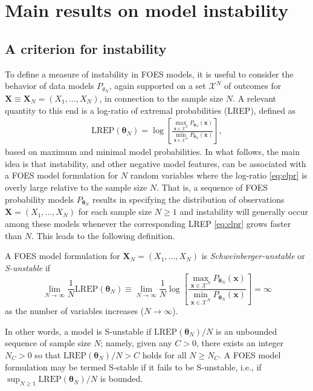 \documentclass[]{article}
\theoremstyle{definition}
\newcommand{\REP}{\mathrm{LREP}}
\let\BeginKnitrBlock\begin \let\EndKnitrBlock\end
\begin{document}
\section{Main results on model instability}\label{instability-results}

\subsection{A criterion for instability}\label{criterion}

To define a measure of instability in FOES models, it is useful to
consider the behavior of data models \(P_{\theta_N}\), again supported
on a set \(\mathcal{X}^N\) of outcomes for
\(\boldsymbol X\equiv \boldsymbol X_N =(X_1,\ldots,X_N)\), in connection
to the sample size \(N\). A relevant quantity to this end is a log-ratio
of extremal probabilities (LREP), defined as
\begin{align}
\label{eq:elpr}
 \REP (\boldsymbol \theta_N)  =  \log \left[\frac{\max\limits_{  \boldsymbol x\in \mathcal{X}^N}P_{\boldsymbol \theta_N}( \boldsymbol x)}{\min\limits_{ \boldsymbol x \in \mathcal{X}^N}P_{\boldsymbol \theta_N}( \boldsymbol x)}\right],
\end{align}
based on maximum and minimal model probabilities. In what follows, the
main idea is that instability, and other negative model features, can be
associated with a FOES model formulation for \(N\) random variables
where the log-ratio \eqref{eq:elpr} is overly large relative to the sample
size \(N\). That is, a sequence of FOES probability models
\(P_{\boldsymbol \theta_N}\) results in specifying the distribution of
observations \(\boldsymbol X=(X_1,\ldots,X_N)\) for each sample size
\(N \geq 1\) and instability will generally occur among these models
whenever the corresponding LREP \eqref{eq:elpr} grows faster than \(N\).
This leads to the following definition.

\BeginKnitrBlock{definition}[S-unstable FOES model]
\protect\hypertarget{def:instabFSFS}{}{\label{def:instabFSFS}
\iffalse (S-unstable FOES model) \fi{} }A FOES model formulation for
\(\boldsymbol X_N=(X_1,\ldots,X_N)\) is \emph{Schweinberger-unstable} or
\emph{S-unstable} if
\begin{equation}
\label{eq:Sun}
\lim \limits_{N \rightarrow \infty} \frac{1}{N} \REP(\boldsymbol \theta_N) \equiv \lim \limits_{N \rightarrow \infty} \frac{1}{N}\log \left[\frac{\max\limits_{  \boldsymbol x\in \mathcal{X}^N}P_{\boldsymbol \theta_N}( \boldsymbol x)}{\min\limits_{ \boldsymbol x \in \mathcal{X}^N}P_{\boldsymbol \theta_N}( \boldsymbol x)}\right] = \infty
\end{equation}
as the number of variables increases (\(N \rightarrow \infty\)).
\EndKnitrBlock{definition} In other words, a model is S-unstable if
\(\REP(\boldsymbol \theta_N)/N\) is an unbounded sequence of sample size
\(N\); namely, given any \(C > 0\), there exists an integer \(N_C > 0\)
so that \(\REP(\boldsymbol \theta_N)/N > C\) holds for all
\(N \ge N_C\). A FOES model formulation may be termed S-stable if it
fails to be S-unstable, i.e., if
\(\sup_{N \geq 1}\REP(\boldsymbol \theta_N)/N\) is bounded.
\end{document}
